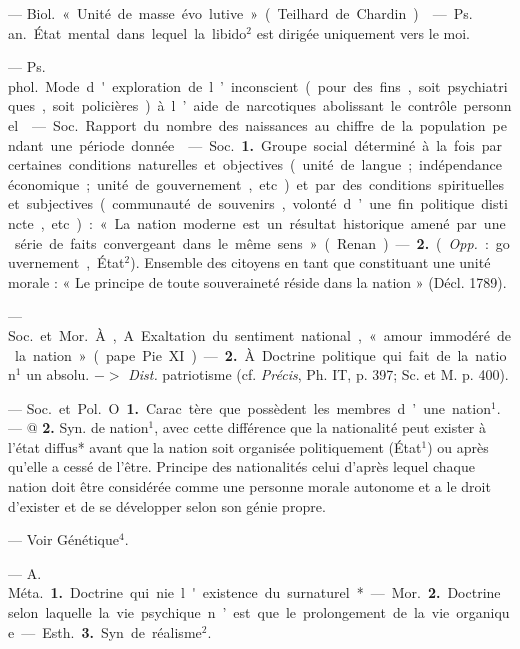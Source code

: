 
	\begin{itemize}[leftmargin=1cm, label=, itemsep=1pt]

 — \si{Biol.} « Unité de masse évo
lutive » (Teilhard de Chardin).

 — \si{Ps. an.} État mental
dans lequel la libido$^2$ est dirigée
uniquement vers le moi.

 — \si{Ps. phol.} Mode
d'exploration de l’inconscient (pour
des fins, soit psychiatriques, soit
policières) à l’aide de narcotiques
abolissant le contrôle personnel.

 — \si{Soc.} Rapport du nombre
des naissances au chiffre de la
population pendant une période
donnée.

 — \si{Soc.} {\bf 1.} Groupe social déterminé à la fois par certaines conditions naturelles et objectives (unité
de langue ; indépendance économique ; unité de gouvernement, etc.) et
par des conditions spirituelles et
subjectives (communauté de souvenirs, volonté d’une fin politique
distincte, etc.) : « La nation moderne est un résultat historique
amené par une série de faits convergeant dans le même sens » (Renan).
— {\bf 2.} ({\it Opp.} : gouvernement, État$^2$).
Ensemble des citoyens en tant que
constituant une unité morale : « Le
principe de toute souveraineté réside dans la nation » (Décl. 1789).

 — \si{Soc.} et \si{Mor.} À, A.
Exaltation du sentiment national,
« amour immodéré de la nation »
(pape Pie XI). — {\bf 2.} À. Doctrine politique qui fait de la nation$^1$ un
absolu. $->$ {\it Dist.} patriotisme (cf.
{\it Précis}, Ph. IT, p. 397; Sc. et M.
p. 400).

 — \si{Soc.} et \si{Pol.} O {\bf 1.} Carac
tère que possèdent les membres
d’une nation$^1$. — @ {\bf 2.} Syn. de nation$^1$,
avec cette différence que la nationalité peut exister à l’état diffus*
avant que la nation soit organisée
politiquement (État$^1$) ou après
qu’elle a cessé de l’être. Principe des
nationalités celui d’après lequel
chaque nation doit être considérée
comme une personne morale autonome et a le droit d’exister et de se
développer selon son génie propre.

 — Voir Génétique$^4$.

 — A. \si{Méta.} {\bf 1.} Doctrine
qui nie l'existence du surnaturel*.
— \si{Mor.} {\bf 2.} Doctrine selon laquelle
la vie psychique n’est que le prolongement de la vie organique. —
\si{Esth.} {\bf 3.} Syn. de réalisme$^2$.


\end{itemize}
